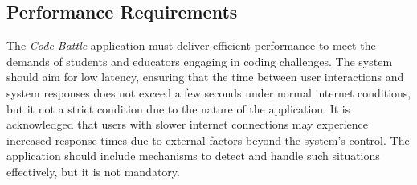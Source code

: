 \subsection{Performance Requirements}
The \textit{Code Battle} application must deliver efficient performance to meet the demands of students and educators engaging in coding challenges. The system should aim for low latency, ensuring that the time between user interactions and system responses does not exceed a few seconds under normal internet conditions, but it not a strict condition due to the nature of the application. It is acknowledged that users with slower internet connections may experience increased response times due to external factors beyond the system's control. The application should include mechanisms to detect and handle such situations effectively, but it is not mandatory. 

